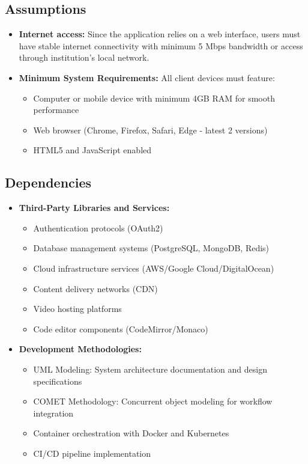 \documentclass[a4paper, 11pt]{scrreprt}
\begin{document}
\subsection{Assumptions}
\begin{itemize}
    \item \textbf{Internet access:} Since the application relies on a web interface, users must have stable internet connectivity with minimum 5 Mbps bandwidth or access through institution's local network.
    \item \textbf{Minimum System Requirements:} All client devices must feature:
        \begin{itemize}
            \item Computer or mobile device with minimum 4GB RAM for smooth performance
            \item Web browser (Chrome, Firefox, Safari, Edge - latest 2 versions)
            \item HTML5 and JavaScript enabled
        \end{itemize}
\end{itemize}

\subsection{Dependencies}
\begin{itemize}
    \item \textbf{Third-Party Libraries and Services:}
        \begin{itemize}
            \item Authentication protocols (OAuth2)
            \item Database management systems (PostgreSQL, MongoDB, Redis)
            \item Cloud infrastructure services (AWS/Google Cloud/DigitalOcean)
            \item Content delivery networks (CDN)
            \item Video hosting platforms
            \item Code editor components (CodeMirror/Monaco)
        \end{itemize}
    \item \textbf{Development Methodologies:}
        \begin{itemize}
            \item UML Modeling: System architecture documentation and design specifications
            \item COMET Methodology: Concurrent object modeling for workflow integration
            \item Container orchestration with Docker and Kubernetes
            \item CI/CD pipeline implementation
        \end{itemize}
\end{itemize}
\end{document}

